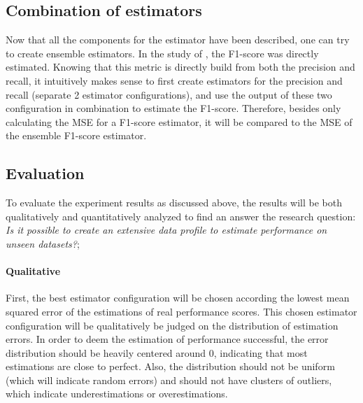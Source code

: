 \subsection{Combination of estimators}
Now that all the components for the estimator have been described, one can try to create ensemble estimators. In the study of \cite{Mahdavi2019-pk}, the F1-score was directly estimated. Knowing that this metric is directly build from both the precision and recall, it intuitively makes sense to first create estimators for the precision and recall (separate 2 estimator configurations), and use the output of these two configuration in combination to estimate the F1-score. Therefore, besides only calculating the MSE for a F1-score estimator, it will be compared to the MSE of the ensemble F1-score estimator.

\subsection{Evaluation}
\label{subsec:evaluation_performanceprediction}
To evaluate the experiment results as discussed above, the results will be both qualitatively and quantitatively analyzed to find an answer the research question: \textit{Is it possible to create an extensive data profile to estimate performance on unseen datasets?};

\paragraph{Qualitative} First, the best estimator configuration will be chosen according the lowest mean squared error of the estimations of real performance scores. This chosen estimator configuration will be qualitatively be judged on the distribution of estimation errors. In order to deem the estimation of performance successful, the error distribution should be heavily centered around 0, indicating that most estimations are close to perfect. Also, the distribution should not be uniform (which will indicate random errors) and should not have clusters of outliers, which indicate underestimations or overestimations. 

